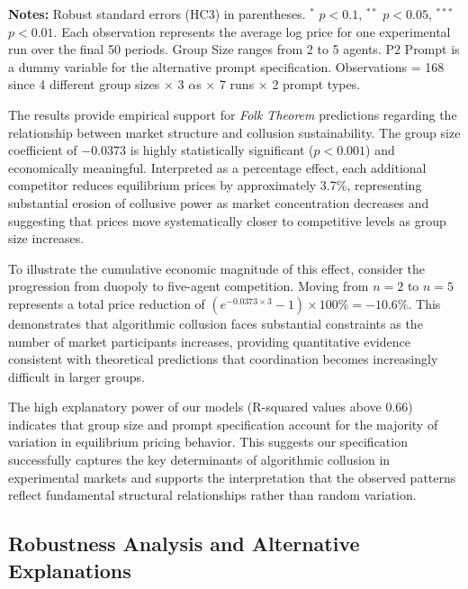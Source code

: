 \begin{table}[htbp!]
\begin{threeparttable}
\begin{tabular}{lcc}
    \bottomrule
    \end{tabular}
    \begin{tablenotes}[flushleft]
    \footnotesize
    \item \textbf{Notes:} Robust standard errors (HC3) in parentheses. $^{*}$ $p<0.1$, $^{**}$ $p<0.05$, $^{***}$ $p<0.01$. Each observation represents the average log price for one experimental run over the final 50 periods. Group Size ranges from 2 to 5 agents. P2 Prompt is a dummy variable for the alternative prompt specification. Observations = 168 since 4 different group sizes $\times$ 3 $\alpha$s $\times$ 7 runs $\times$ 2 prompt types.
    \end{tablenotes}
    \end{threeparttable}
\end{table}

The results provide empirical support for \emph{Folk Theorem} predictions regarding the relationship between market structure and collusion sustainability. The group size coefficient of $-0.0373$ is highly statistically significant ($p < 0.001$) and economically meaningful. Interpreted as a percentage effect, each additional competitor reduces equilibrium prices by approximately 3.7\%, representing substantial erosion of collusive power as market concentration decreases and suggesting that prices move systematically closer to competitive levels as group size increases. 

To illustrate the cumulative economic magnitude of this effect, consider the progression from duopoly to five-agent competition. Moving from $n=2$ to $n=5$ represents a total price reduction of $(e^{-0.0373 \times 3} - 1) \times 100\% = -10.6\%$. This demonstrates that algorithmic collusion faces substantial constraints as the number of market participants increases, providing quantitative evidence consistent with theoretical predictions that coordination becomes increasingly difficult in larger groups.

The high explanatory power of our models (R-squared values above 0.66) indicates that group size and prompt specification account for the majority of variation in equilibrium pricing behavior. This suggests our specification successfully captures the key determinants of algorithmic collusion in experimental markets and supports the interpretation that the observed patterns reflect fundamental structural relationships rather than random variation.

\subsection{Robustness Analysis and Alternative Explanations}

